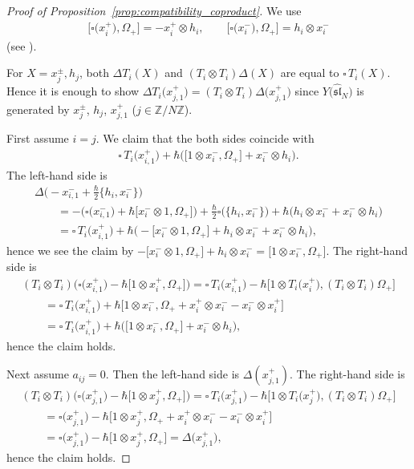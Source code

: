 \documentclass[10pt,a4paper]{amsart}
\theoremstyle{definition}
\numberwithin{equation}{section}
\newcommand{\bbZ}{\mathbb{Z}}
\newcommand{\affY}{Y\big(\affsl\big)}
\newcommand{\affsl}{\hat{\mathfrak{sl}}_N}
\begin{document}
\begin{proof}[Proof of Proposition~\ref{prop:compatibility_coproduct}]
We use
\begin{gather*}
\big[\square\big(x_i^+\big), \Omega_+\big] = -x_i^+ \otimes h_i, \qquad \big[\square\big(x_i^-\big), \Omega_+\big] = h_i \otimes x_i^-
\end{gather*}
(see \cite[Lemma~4.2]{MR3861718}).

For $X=x_j^{\pm}, h_j$, both $\Delta T_i(X)$ and $(T_i \otimes T_i) \Delta(X)$ are equal to $\square\, T_i(X)$. Hence it is enough to show $\Delta T_i\big(x_{j,1}^+\big) = (T_i \otimes T_i)\Delta\big(x_{j,1}^+\big)$ since $\affY$ is generated by $x_j^{\pm}$, $h_j$, $x_{j,1}^+$ ($j \in \bbZ/N\bbZ$).

First assume $i=j$. We claim that the both sides coincide with
\begin{gather*}
\square \, T_i\big(x_{i,1}^+\big) +\hbar \big(\big[1 \otimes x_i^-, \Omega_+\big] + x_i^- \otimes h_i \big).
\end{gather*}
The left-hand side is
\begin{gather*}
\Delta\big({-}x_{i,1}^- + \tfrac{\hbar}{2}\big\{h_i,x_i^-\big\}\big) \\
\qquad{} = -\big(\square\big(x_{i,1}^-\big) + \hbar\big[x_i^- \otimes 1,\Omega_+\big]\big) + \tfrac{\hbar}{2} \square\big(\big\{h_i,x_i^-\big\}\big) + \hbar\big(h_i \otimes x_i^- + x_i^- \otimes h_i\big) \\
\qquad{} = \square\,T_i\big(x_{i,1}^+\big) + \hbar \big({-}\big[x_i^- \otimes 1,\Omega_+\big] + h_i \otimes x_i^- + x_i^- \otimes h_i \big),
\end{gather*}
hence we see the claim by $-\big[x_i^- \otimes 1,\Omega_+\big] + h_i \otimes x_i^- = \big[1 \otimes x_i^-,\Omega_+\big]$. The right-hand side is
\begin{gather*}
(T_i \otimes T_i)\big(\square\big(x_{i,1}^+\big)-\hbar\big[1 \otimes x_i^+,\Omega_+\big]\big) = \square\,T_i\big(x_{i,1}^+\big) - \hbar\big[1 \otimes T_i\big(x_i^+\big), (T_i \otimes T_i)\Omega_+\big]\\
\qquad {} = \square\,T_i\big(x_{i,1}^+\big) + \hbar\big[1 \otimes x_i^-, \Omega_+ + x_i^+ \otimes x_i^- - x_i^- \otimes x_i^+\big]\\
\qquad {} = \square\,T_i\big(x_{i,1}^+\big) + \hbar \big(\big[1 \otimes x_i^-, \Omega_+\big] + x_i^- \otimes h_i\big),
\end{gather*}
hence the claim holds.

Next assume $a_{ij}=0$. Then the left-hand side is $\Delta(x_{j,1}^+)$. The right-hand side is
\begin{gather*}
(T_i \otimes T_i)\big(\square\big(x_{j,1}^+\big)-\hbar\big[1 \otimes x_j^+,\Omega_+\big]\big) = \square\, T_i\big(x_{j,1}^+\big) - \hbar\big[1 \otimes T_i\big(x_j^+\big), (T_i \otimes T_i)\Omega_+\big]\\
\qquad{} = \square\big(x_{j,1}^+\big) - \hbar\big[1 \otimes x_j^+, \Omega_+ + x_i^+ \otimes x_i^- - x_i^- \otimes x_i^+\big]\\
\qquad{} = \square\big(x_{j,1}^+\big) - \hbar\big[1 \otimes x_j^+, \Omega_+\big] = \Delta\big(x_{j,1}^+\big),
\end{gather*}
hence the claim holds.


\end{proof}
\end{document}
